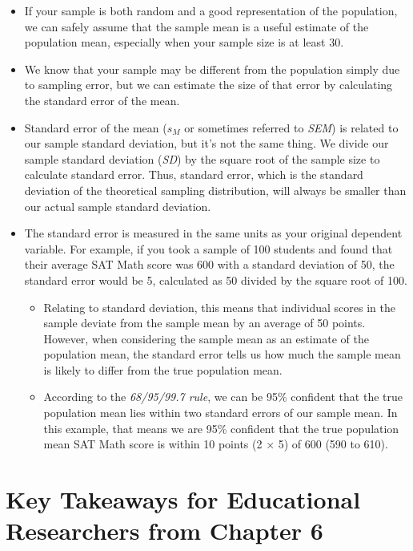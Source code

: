 \documentclass[
  letterpaper,
  DIV=11,
  numbers=noendperiod]{scrreprt}
\begin{document}
\begin{itemize}
\item
  If your sample is both random and a good representation of the
  population, we can safely assume that the sample mean is a useful
  estimate of the population mean, especially when your sample size is
  at least 30.
\item
  We know that your sample may be different from the population simply
  due to sampling error, but we can estimate the size of that error by
  calculating the standard error of the mean.
\item
  Standard error of the mean (\(s_M\) or sometimes referred to
  \emph{SEM}) is related to our sample standard deviation, but it's not
  the same thing. We divide our sample standard deviation (\emph{SD}) by
  the square root of the sample size to calculate standard error. Thus,
  standard error, which is the standard deviation of the theoretical
  sampling distribution, will always be smaller than our actual sample
  standard deviation.
\item
  The standard error is measured in the same units as your original
  dependent variable. For example, if you took a sample of 100 students
  and found that their average SAT Math score was 600 with a standard
  deviation of 50, the standard error would be 5, calculated as 50
  divided by the square root of 100.

  \begin{itemize}
  \item
    Relating to standard deviation, this means that individual scores in
    the sample deviate from the sample mean by an average of 50 points.
    However, when considering the sample mean as an estimate of the
    population mean, the standard error tells us how much the sample
    mean is likely to differ from the true population mean.
  \item
    According to the \emph{68/95/99.7 rule}, we can be 95\% confident
    that the true population mean lies within two standard errors of our
    sample mean. In this example, that means we are 95\% confident that
    the true population mean SAT Math score is within 10 points (2 × 5)
    of 600 (590 to 610).
  \end{itemize}
\end{itemize}

\section*{Key Takeaways for Educational Researchers from Chapter
6}\label{key-takeaways-for-educational-researchers-from-chapter-6}
\end{document}
